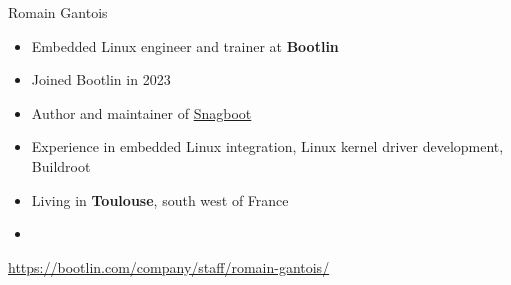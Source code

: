 \begin{frame}{Romain Gantois}
  \begin{itemize}
  \item Embedded Linux engineer and trainer at {\bf Bootlin}
  \item Joined Bootlin in 2023
  \item Author and maintainer of \href{https://github.com/bootlin/snagboot}{Snagboot}
  \item Experience in embedded Linux integration, Linux kernel driver
    development, Buildroot
  \item Living in {\bf Toulouse}, south west of France
  \item {}
  \end{itemize}
  {\small \url{https://bootlin.com/company/staff/romain-gantois/}}
\end{frame}
